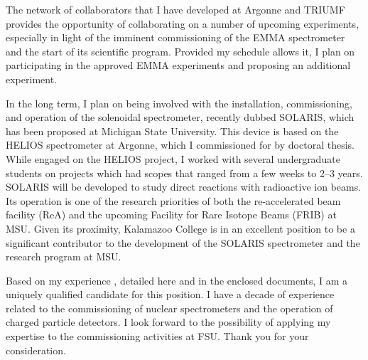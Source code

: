 {%
%


The  network of collaborators that I have developed at Argonne and TRIUMF provides the opportunity of collaborating on a number of upcoming experiments, especially in light of the imminent commissioning of the EMMA spectrometer and the start of its scientific program. Provided my schedule allows it, I plan on participating in the approved EMMA experiments and proposing an additional experiment.



In the long term, I plan on being involved with the installation, commissioning, and operation of the solenoidal spectrometer, recently dubbed 
SOLARIS, which has been proposed at Michigan State University. This device is based on the HELIOS spectrometer at Argonne, which I commissioned for by doctoral thesis. While engaged on the HELIOS project, I worked with several undergraduate students on projects which had scopes that ranged from a few weeks to 2--3 years. 
 SOLARIS will be developed to study direct reactions with radioactive ion beams. Its operation is one of the research priorities 
of both the re-accelerated beam facility (ReA) and the upcoming Facility for Rare Isotope Beams (FRIB) at MSU.
Given its proximity, Kalamazoo College is in an excellent position to be a significant contributor to the development of the SOLARIS spectrometer and the research program at MSU. 

\vspace{1.0\baselineskip}%
Based on my experience%
, detailed here and in the enclosed documents, I am a uniquely qualified candidate for this position.  I have a decade of experience related to the commissioning of nuclear spectrometers and the operation of charged particle detectors. I look forward to the possibility of applying my expertise to the commissioning activities %
at FSU. Thank you for your consideration.%

}